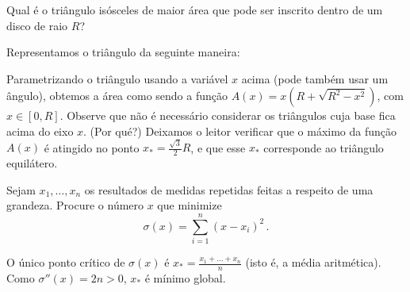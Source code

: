 \begin{exo}
Qual é o triângulo isósceles de maior área que pode ser inscrito
dentro de um disco de raio $R$?
\begin{sol} Representamos o triângulo da seguinte maneira:
\begin{center}
\begin{bmlimage}\end{bmlimage}
\end{center}
Parametrizando o triângulo usando a variável $x$ acima (pode
também usar um ângulo),
obtemos a área como sendo a função
$A(x)=x(R+\sqrt{R^2-x^2})$, com $x\in [0,R]$. 
Observe que não é necessário considerar os triângulos cuja
base fica acima do eixo $x$. (Por qué?)
Deixamos o leitor verificar que o máximo da função $A(x)$ é
atingido no ponto $x_*=\tfrac{\sqrt{3}}{2}R$, e que esse $x_*$
corresponde ao triângulo equilátero.
\end{sol}
\end{exo}

\begin{exo}
Sejam $x_1,\dots,x_n$ os resultados de medidas repetidas feitas a respeito de
uma grandeza. Procure o número $x$ que minimize 
$$\sigma(x)=\sum_{i=1}^n(x-x_i)^2\,.$$
\begin{sol}
O único ponto crítico de $\sigma(x)$ é $x_*=\frac{x_1+\dots+ x_n}{n}$ (isto é,
a média aritmética). Como $\sigma''(x)=2n>0$, $x_*$ é mínimo global.
\end{sol}
\end{exo}


